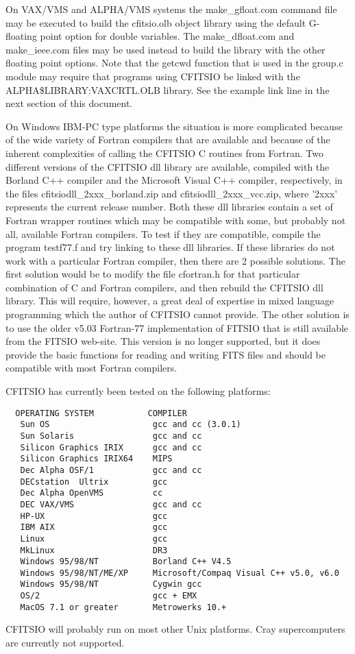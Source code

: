 \documentclass[11pt]{book}
\begin{document}
On VAX/VMS and ALPHA/VMS systems the make\_gfloat.com command file may
be executed to build the cfitsio.olb object library using the default
G-floating point option for double variables.  The make\_dfloat.com and
make\_ieee.com files may be used instead to build the library with the
other floating point options. Note that the getcwd function that is
used in the group.c module may require that programs using CFITSIO be
linked with the ALPHA\$LIBRARY:VAXCRTL.OLB library.  See the example
link line in the next section of this document.

On Windows IBM-PC type platforms the situation is more complicated
because of the wide variety of Fortran compilers that are available and
because of the inherent complexities of calling the CFITSIO C routines
from Fortran.  Two different versions of the CFITSIO dll library are
available, compiled with the Borland C++ compiler and the Microsoft
Visual C++ compiler, respectively, in the files
cfitsiodll\_2xxx\_borland.zip and cfitsiodll\_2xxx\_vcc.zip, where
'2xxx' represents the current release number.  Both these dll libraries
contain a set of Fortran wrapper routines which may be compatible with
some, but probably not all, available Fortran compilers.  To test if
they are compatible, compile the program testf77.f and try linking to
these dll libraries.  If these libraries do not work with a particular
Fortran compiler, then there are 2 possible solutions.  The first
solution would be to modify the file cfortran.h for that particular
combination of C and Fortran compilers, and then rebuild the CFITSIO
dll library.  This will require, however, a great deal of expertise in
mixed language programming which the author of CFITSIO cannot provide.
The other solution is to use the older v5.03 Fortran-77 implementation
of FITSIO that is still available from the FITSIO web-site.  This
version is no longer supported, but it does provide the basic functions
for reading and writing FITS files and should be compatible with most
Fortran compilers.

CFITSIO has currently been tested on the following platforms:

\begin{verbatim}
  OPERATING SYSTEM           COMPILER
   Sun OS                     gcc and cc (3.0.1)
   Sun Solaris                gcc and cc
   Silicon Graphics IRIX      gcc and cc
   Silicon Graphics IRIX64    MIPS
   Dec Alpha OSF/1            gcc and cc
   DECstation  Ultrix         gcc
   Dec Alpha OpenVMS          cc
   DEC VAX/VMS                gcc and cc
   HP-UX                      gcc
   IBM AIX                    gcc
   Linux                      gcc
   MkLinux                    DR3
   Windows 95/98/NT           Borland C++ V4.5
   Windows 95/98/NT/ME/XP     Microsoft/Compaq Visual C++ v5.0, v6.0
   Windows 95/98/NT           Cygwin gcc
   OS/2                       gcc + EMX
   MacOS 7.1 or greater       Metrowerks 10.+
\end{verbatim}
CFITSIO will probably run on most other Unix platforms.  Cray
supercomputers are currently not supported.
\end{document}
